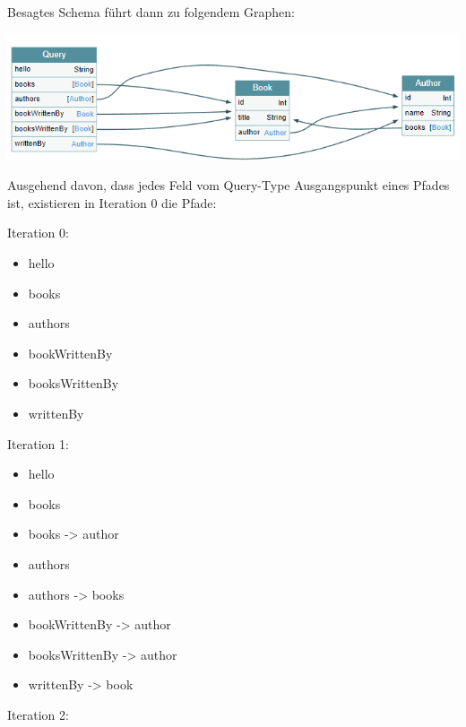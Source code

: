 Besagtes Schema führt dann zu folgendem Graphen:

\begin{center}
  \includegraphics[width=\textwidth,height=\textheight,keepaspectratio]{img/graph-paths}
\end{center}

Ausgehend davon, dass jedes Feld vom Query-Type Ausgangspunkt eines Pfades ist, existieren in Iteration 0 die Pfade:

Iteration 0:

\begin{itemize}
  \item hello
  \item books
  \item authors
  \item bookWrittenBy
  \item booksWrittenBy
  \item writtenBy
\end{itemize}

Iteration 1:

\begin{itemize}
  \item hello
  \item books
  \item books -> author
  \item authors
  \item authors -> books
  \item bookWrittenBy -> author
  \item booksWrittenBy -> author
  \item writtenBy -> book
\end{itemize}

Iteration 2:

